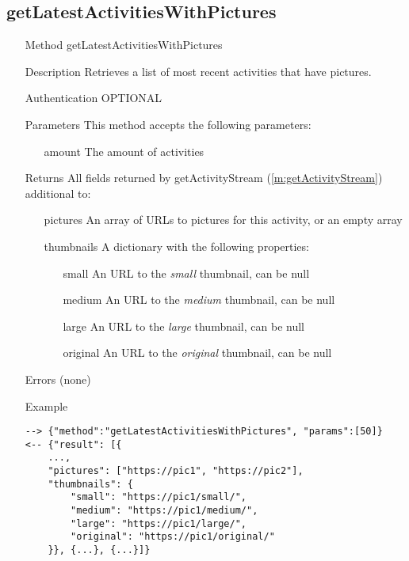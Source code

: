 \documentclass[a4paper]{scrreprt}
\begin{document}
\subsection{getLatestActivitiesWithPictures}
\begin{enumerate}
\item[Method] getLatestActivitiesWithPictures
\item[Description] Retrieves a list of most recent activities that have pictures.
\item[Authentication] OPTIONAL
\item[Parameters] This method accepts the following parameters:
\begin{enumerate}
	\item[amount] The amount of activities
    \end{enumerate}
\item[Returns] All fields returned by getActivityStream (\ref{m:getActivityStream}) additional to:
\begin{enumerate}
    \item[pictures] An array of URLs to pictures for this activity, or an empty array
    \item[thumbnails] A dictionary with the following properties:
    \begin{enumerate}
        \item[small] An URL to the \textit{small} thumbnail, can be null
        \item[medium] An URL to the \textit{medium} thumbnail, can be null
        \item[large] An URL to the \textit{large} thumbnail, can be null
        \item[original] An URL to the \textit{original} thumbnail, can be null
        \end{enumerate}
    \end{enumerate}
\item[Errors] (none)
\item[Example]
\begin{lstlisting}
--> {"method":"getLatestActivitiesWithPictures", "params":[50]}
<-- {"result": [{
    ...,
    "pictures": ["https://pic1", "https://pic2"],
    "thumbnails": {
        "small": "https://pic1/small/",
        "medium": "https://pic1/medium/",
        "large": "https://pic1/large/",
        "original": "https://pic1/original/"
    }}, {...}, {...}]}
\end{lstlisting}
\end{enumerate}
\end{document}
